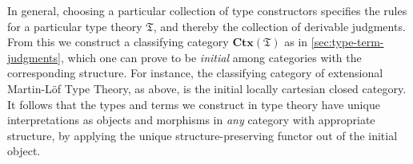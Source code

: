 \documentclass[10pt]{article}
\let\jdeq\equiv
\def\ty{\;\mathsf{type}}
\def\tsm{\textstyle\sum}
\def\proj#1{\mathsf{pr}_{#1}}
\def\types{\vdash}
\def\equiv{\mathsf{Equiv}}
\def\fT{\mathfrak{T}}
\def\CtxT{\mathbf{Ctx}(\fT)}
\numberwithin{equation}{section}
\begin{document}

In general, choosing a particular collection of type constructors specifies the rules for a particular type theory $\fT$, and thereby the collection of derivable judgments.
From this we construct a classifying category $\CtxT$ as in \cref{sec:type-term-judgments}, which
one can prove to be \emph{initial} among categories with the corresponding structure.
For instance, the classifying category of extensional Martin-L\"of Type Theory, as above, is the initial locally cartesian closed category.
It follows that the types and terms we construct in type theory have unique interpretations as objects and morphisms in \emph{any} category with appropriate structure, by applying the unique structure-preserving functor out of the initial object.
\end{document}
